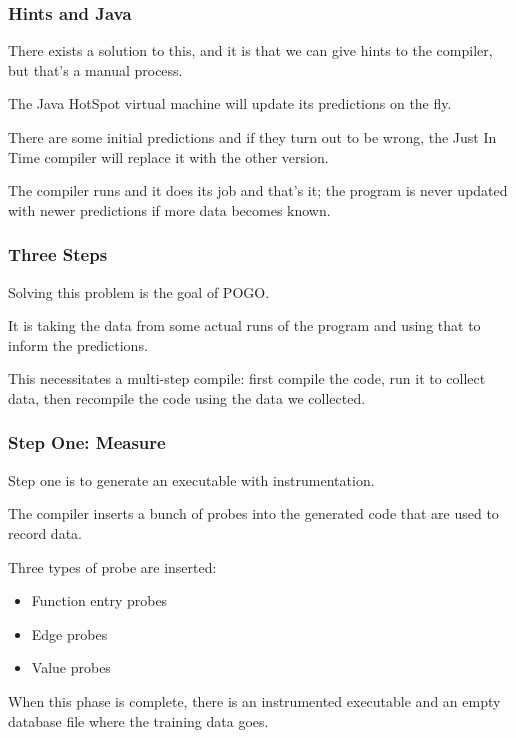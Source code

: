 \begin{frame}
\frametitle{Hints and Java}

There exists a solution to this, and it is that we can give hints to the compiler, but that's a manual process. 

The Java HotSpot virtual machine will update its predictions on the fly. 

There are some initial predictions and if they turn out to be wrong, the Just In Time compiler will replace it with the other version. 

The compiler runs and it does its job and that's it; the program is never updated with newer predictions if more data becomes known.

\end{frame}



\begin{frame}
\frametitle{Three Steps}

Solving this problem is the goal of POGO. 

It is taking the data from some actual runs of the program and using that to inform the predictions. 

This necessitates a multi-step compile: first compile the code, run it to collect data, then recompile the code using the data we collected.


\end{frame}



\begin{frame}
\frametitle{Step One: Measure}

Step one is to generate an executable with instrumentation. 

The compiler inserts a bunch of probes into the generated code that are used to record data. 

Three types of probe are inserted: 
\begin{itemize}
\item Function entry probes
\item Edge probes
\item Value probes
\end{itemize}

When this phase is complete, there is an instrumented executable and an empty database file where the training data goes.

\end{frame}



